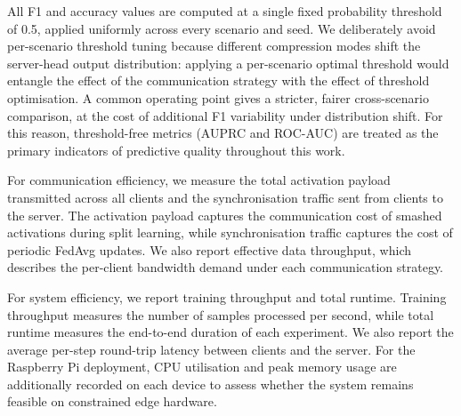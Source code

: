 \documentclass[conference]{IEEEtran}
\begin{document}
All F1 and accuracy values are computed at a single fixed probability threshold of 0.5, applied uniformly across every scenario and seed. We deliberately avoid per-scenario threshold tuning because different compression modes shift the server-head output distribution: applying a per-scenario optimal threshold would entangle the effect of the communication strategy with the effect of threshold optimisation. A common operating point gives a stricter, fairer cross-scenario comparison, at the cost of additional F1 variability under distribution shift. For this reason, threshold-free metrics (AUPRC and ROC-AUC) are treated as the primary indicators of predictive quality throughout this work.

For communication efficiency, we measure the total activation payload transmitted across all clients and the synchronisation traffic sent from clients to the server. The activation payload captures the communication cost of smashed activations during split learning, while synchronisation traffic captures the cost of periodic FedAvg updates. We also report effective data throughput, which describes the per-client bandwidth demand under each communication strategy.

For system efficiency, we report training throughput and total runtime. Training throughput measures the number of samples processed per second, while total runtime measures the end-to-end duration of each experiment. We also report the average per-step round-trip latency between clients and the server. For the Raspberry Pi deployment, CPU utilisation and peak memory usage are additionally recorded on each device to assess whether the system remains feasible on constrained edge hardware.
\end{document}
